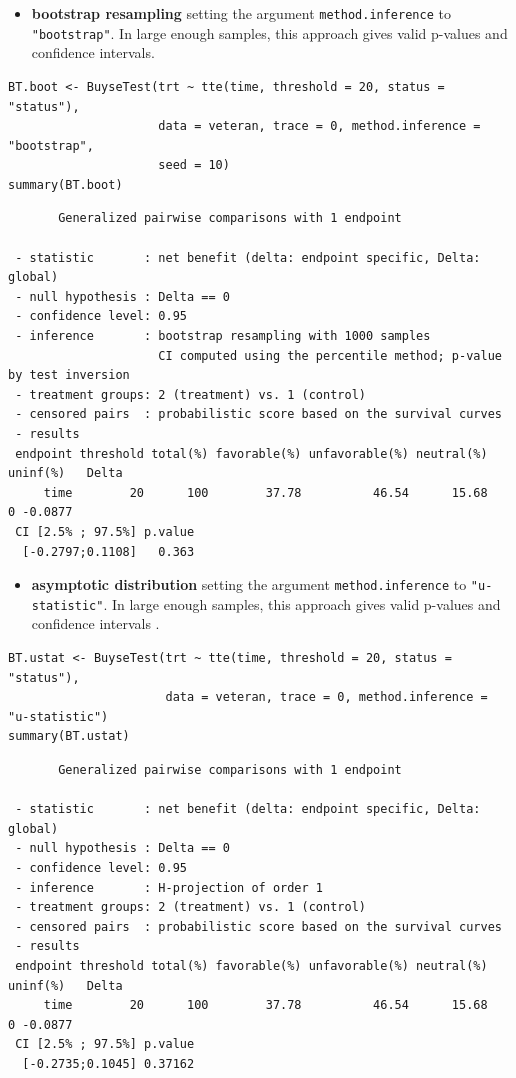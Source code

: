 \documentclass[12pt]{article}
\begin{document}
\begin{itemize}
\item \textbf{bootstrap resampling} setting the argument \texttt{method.inference} to
\texttt{"bootstrap"}. In large enough samples, this approach gives valid
p-values and confidence intervals.
\end{itemize}

\lstset{language=r,label= ,caption= ,captionpos=b,numbers=none}
\begin{lstlisting}
BT.boot <- BuyseTest(trt ~ tte(time, threshold = 20, status = "status"),
                     data = veteran, trace = 0, method.inference = "bootstrap",
                     seed = 10) 
summary(BT.boot)
\end{lstlisting}

\begin{verbatim}
       Generalized pairwise comparisons with 1 endpoint

 - statistic       : net benefit (delta: endpoint specific, Delta: global) 
 - null hypothesis : Delta == 0 
 - confidence level: 0.95 
 - inference       : bootstrap resampling with 1000 samples 
                     CI computed using the percentile method; p-value by test inversion 
 - treatment groups: 2 (treatment) vs. 1 (control) 
 - censored pairs  : probabilistic score based on the survival curves
 - results
 endpoint threshold total(%) favorable(%) unfavorable(%) neutral(%) uninf(%)   Delta
     time        20      100        37.78          46.54      15.68        0 -0.0877
 CI [2.5% ; 97.5%] p.value 
  [-0.2797;0.1108]   0.363
\end{verbatim}

\begin{itemize}
\item \textbf{asymptotic distribution} setting the argument \texttt{method.inference} to
\texttt{"u-statistic"}. In large enough samples, this approach gives valid
p-values and confidence intervals \citep{ozenne2021asymptotic}.
\end{itemize}

\lstset{language=r,label= ,caption= ,captionpos=b,numbers=none}
\begin{lstlisting}
BT.ustat <- BuyseTest(trt ~ tte(time, threshold = 20, status = "status"),
                      data = veteran, trace = 0, method.inference = "u-statistic") 
summary(BT.ustat)
\end{lstlisting}

\begin{verbatim}
       Generalized pairwise comparisons with 1 endpoint

 - statistic       : net benefit (delta: endpoint specific, Delta: global) 
 - null hypothesis : Delta == 0 
 - confidence level: 0.95 
 - inference       : H-projection of order 1
 - treatment groups: 2 (treatment) vs. 1 (control) 
 - censored pairs  : probabilistic score based on the survival curves
 - results
 endpoint threshold total(%) favorable(%) unfavorable(%) neutral(%) uninf(%)   Delta
     time        20      100        37.78          46.54      15.68        0 -0.0877
 CI [2.5% ; 97.5%] p.value 
  [-0.2735;0.1045] 0.37162
\end{verbatim}
\end{document}
